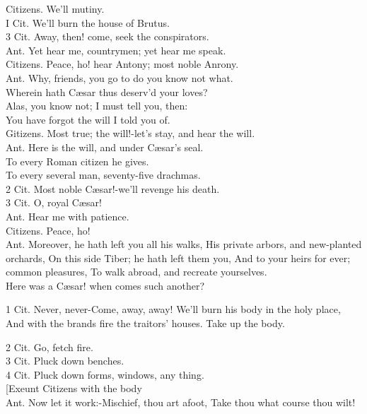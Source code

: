 \documentclass[10pt]{article}
\begin{document}
Citizens. We'll mutiny.\\
I Cit. We'll burn the house of Brutus.\\
3 Cit. Away, then! come, seek the conspirators.\\
Ant. Yet hear me, countrymen; yet hear me speak.\\
Citizens. Peace, ho! hear Antony; most noble Anrony.\\
Ant. Why, friends, you go to do you know not what.\\
Wherein hath Cæsar thus deserv'd your loves?\\
Alas, you know not; I must tell you, then:\\
You have forgot the will I told you of.\\
Gitizens. Most true; the will!-let's stay, and hear the will.\\
Ant. Here is the will, and under Cæsar's seal.\\
To every Roman citizen he gives.\\
To every several man, seventy-five drachmas.\\
2 Cit. Most noble Cæsar!-we'll revenge his death.\\
3 Cit. O, royal Cæsar!\\
Ant. Hear me with patience.\\
Citizens. Peace, ho!\\
Ant. Moreover, he hath left you all his walks, His private arbors, and new-planted orchards, On this side Tiber; he hath left them you, And to your heirs for ever; common pleasures, To walk abroad, and recreate yourselves.\\
Here was a Cæsar! when comes such another?

1 Cit. Never, never-Come, away, away! We'll burn his body in the holy place, And with the brands fire the traitors' houses. Take up the body.

2 Cit. Go, fetch fire.\\
3 Cit. Pluck down benches.\\
4 Cit. Pluck down forms, windows, any thing.\\[0pt]
[Exeunt Citizens with the body\\
Ant. Now let it work:-Mischief, thou art afoot, Take thou what course thou wilt!
\end{document}
